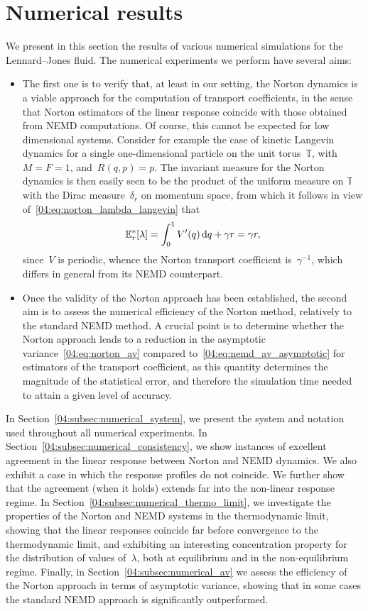 \section{Numerical results}\label{04:sec:numerical}
We present in this section the results of various numerical simulations for the Lennard--Jones fluid.
The numerical experiments we perform have several aims:
\begin{itemize}
\item {The first one is to verify that, at least in our setting, the Norton dynamics is a viable approach for the computation of transport coefficients, in the sense that Norton estimators of the linear response coincide with those obtained from NEMD computations. Of course, this cannot be expected for low dimensional systems. Consider for example the case of  kinetic Langevin dynamics for a single one-dimensional particle on the unit torus~$\mathbb{T}$, with~$ M = F = 1$, and~$R(q,p) = p$. The invariant measure for the Norton dynamics is then easily seen to be the product of the uniform measure on 
$\mathbb{T}$ with the Dirac measure~$\delta_r$ on momentum space, from which it follows in view of~\eqref{04:eq:norton_lambda_langevin} that
\[\mathbb{E}_r^*[\lambda] = \int_0^1 V'(q)\,\mathrm{d} q +\gamma r = \gamma r,\]
since~$V$ is periodic, whence the Norton transport coefficient is~$\gamma^{-1}$, which differs in general from its NEMD counterpart.}

\item {Once the validity of the Norton approach has been established, the second aim is to assess the numerical efficiency of the Norton method, relatively to the standard NEMD method. A crucial point is to determine whether the Norton approach leads to a reduction in the asymptotic variance~\eqref{04:eq:norton_av} compared to~\eqref{04:eq:nemd_av_asymptotic} for estimators of the transport coefficient, as this quantity determines the magnitude of the statistical error, and therefore the simulation time needed to attain a given level of accuracy.}
\end{itemize}

In Section~\ref{04:subsec:numerical_system}, we present the system and notation used throughout all numerical experiments. In Section~\ref{04:subsec:numerical_consistency}, we show instances of excellent agreement in the linear response between Norton and NEMD dynamics. We also exhibit a case in which the response profiles do not coincide. We further show that the agreement (when it holds) extends far into the non-linear response regime. In Section~\ref{04:subsec:numerical_thermo_limit}, we investigate the properties of the Norton and NEMD systems in the thermodynamic limit, showing that the linear responses coincide far before convergence to the thermodynamic limit, and exhibiting an interesting concentration property for the distribution of values of~$\lambda$, both at equilibrium and in the non-equilibrium regime. Finally, in Section~\ref{04:subsec:numerical_av} we assess the efficiency of the Norton approach in terms of asymptotic variance, showing that in some cases the standard NEMD approach is significantly outperformed.

